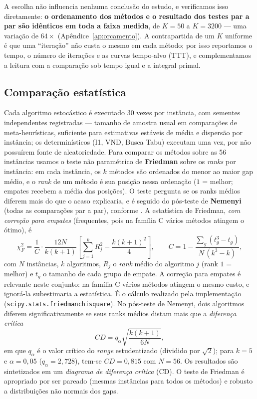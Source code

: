 \documentclass[12pt, a4paper]{article}
\begin{document}
A escolha não influencia nenhuma conclusão do estudo, e verificamos isso diretamente: \textbf{o ordenamento dos métodos e o resultado dos testes par a par são idênticos em toda a faixa medida}, de $K=50$ a $K=3200$ --- uma variação de $64\times$ (Apêndice~\ref{ap:orcamento}). A contrapartida de um $K$ uniforme é que uma ``iteração'' não custa o mesmo em cada método; por isso reportamos o tempo, o número de iterações e as curvas tempo-alvo (TTT), e complementamos a leitura com a comparação sob tempo igual e a integral primal.



\subsection{Comparação estatística}\label{sec:estatistica}
Cada algoritmo estocástico é executado 30 vezes por instância, com sementes independentes registradas --- tamanho de amostra usual em comparações de meta-heurísticas, suficiente para estimativas estáveis de média e dispersão por instância; os determinísticos (I1, VND, Busca Tabu) executam uma vez, por não possuírem fonte de aleatoriedade. Para comparar os métodos sobre as 56 instâncias usamos o teste não paramétrico de \textbf{Friedman} sobre os \emph{ranks} por instância: em cada instância, os $k$ métodos são ordenados do menor ao maior gap médio, e o \emph{rank} de um método é sua posição nessa ordenação ($1$ = melhor; empates recebem a média das posições). O teste pergunta se os ranks médios diferem mais do que o acaso explicaria, e é seguido do pós-teste de \textbf{Nemenyi} (todas as comparações par a par), conforme \citet{demsar2006statistical}. A estatística de Friedman, \emph{com correção para empates} (frequentes, pois na família C vários métodos atingem o ótimo), é
\begin{equation}
\chi^2_F=\frac{1}{C}\cdot\frac{12N}{k(k+1)}\left[\sum_{j=1}^{k}R_j^2-\frac{k(k+1)^2}{4}\right],
\qquad C=1-\frac{\sum_g (t_g^3-t_g)}{N\,(k^3-k)},
\end{equation}
com $N$ instâncias, $k$ algoritmos, $R_j$ o \emph{rank} médio do algoritmo $j$ (rank $1$ = melhor) e $t_g$ o tamanho de cada grupo de empate. A correção para empates é relevante neste conjunto: na família C vários métodos atingem o mesmo custo, e ignorá-la subestimaria a estatística. É o cálculo realizado pela implementação (\texttt{scipy.stats.friedmanchisquare}). No pós-teste de Nemenyi, dois algoritmos diferem significativamente se seus ranks médios distam mais que a \emph{diferença crítica}
\begin{equation}
CD=q_\alpha\sqrt{\frac{k(k+1)}{6N}},
\end{equation}
em que $q_\alpha$ é o valor crítico do \emph{range} estudentizado (dividido por $\sqrt2$); para $k=5$ e $\alpha=0{,}05$ ($q_\alpha=2{,}728$), tem-se $CD=0{,}815$ com $N=56$. Os resultados são sintetizados em um \emph{diagrama de diferença crítica} (CD). O teste de Friedman é apropriado por ser pareado (mesmas instâncias para todos os métodos) e robusto a distribuições não normais dos gaps.
\end{document}
